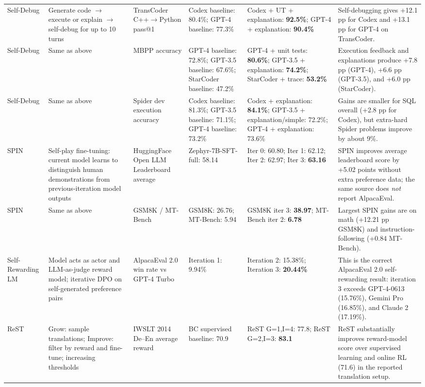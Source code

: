 \begin{table}[t]
{\begin{tabular}{p{2.9cm}p{3.0cm}p{2.7cm}p{2.8cm}p{2.8cm}p{4.8cm}}
Self-Debug \cite{selfdebug2023} & Generate code $\rightarrow$ execute or explain $\rightarrow$ self-debug for up to 10 turns & TransCoder C++$\rightarrow$Python pass@1 & Codex baseline: 80.4\%; GPT-4 baseline: 77.3\% & Codex + UT + explanation: \textbf{92.5\%}; GPT-4 + explanation: \textbf{90.4\%} & Self-debugging gives +12.1 pp for Codex and +13.1 pp for GPT-4 on TransCoder. \\
Self-Debug \cite{selfdebug2023} & Same as above & MBPP accuracy & GPT-4 baseline: 72.8\%; GPT-3.5 baseline: 67.6\%; StarCoder baseline: 47.2\% & GPT-4 + unit tests: \textbf{80.6\%}; GPT-3.5 + explanation: \textbf{74.2\%}; StarCoder + trace: \textbf{53.2\%} & Execution feedback and explanations produce +7.8 pp (GPT-4), +6.6 pp (GPT-3.5), and +6.0 pp (StarCoder). \\
Self-Debug \cite{selfdebug2023} & Same as above & Spider dev execution accuracy & Codex baseline: 81.3\%; GPT-3.5 baseline: 71.1\%; GPT-4 baseline: 73.2\% & Codex + explanation: \textbf{84.1\%}; GPT-3.5 + explanation/simple: 72.2\%; GPT-4 + explanation: 73.6\% & Gains are smaller for SQL overall (+2.8 pp for Codex), but extra-hard Spider problems improve by about 9\%. \\
SPIN \cite{spin2024} & Self-play fine-tuning: current model learns to distinguish human demonstrations from previous-iteration model outputs & HuggingFace Open LLM Leaderboard average & Zephyr-7B-SFT-full: 58.14 & Iter 0: 60.80; Iter 1: 62.12; Iter 2: 62.97; Iter 3: \textbf{63.16} & SPIN improves average leaderboard score by +5.02 points without extra preference data; the same source does \emph{not} report AlpacaEval. \\
SPIN \cite{spin2024} & Same as above & GSM8K / MT-Bench & GSM8K: 26.76; MT-Bench: 5.94 & GSM8K iter 3: \textbf{38.97}; MT-Bench iter 2: \textbf{6.78} & Largest SPIN gains are on math (+12.21 pp GSM8K) and instruction-following (+0.84 MT-Bench). \\
Self-Rewarding LM \cite{selfrewarding2024} & Model acts as actor and LLM-as-judge reward model; iterative DPO on self-generated preference pairs & AlpacaEval 2.0 win rate vs GPT-4 Turbo & Iteration 1: 9.94\% & Iteration 2: 15.38\%; Iteration 3: \textbf{20.44\%} & This is the correct AlpacaEval 2.0 self-rewarding result: iteration 3 exceeds GPT-4-0613 (15.76\%), Gemini Pro (16.85\%), and Claude 2 (17.19\%). \\
ReST \cite{rest2023} & Grow: sample translations; Improve: filter by reward and fine-tune; increasing thresholds & IWSLT 2014 De--En average reward & BC supervised baseline: 70.9 & ReST G=1,I=4: 77.8; ReST G=2,I=3: \textbf{83.1} & ReST substantially improves reward-model score over supervised learning and online RL (71.6) in the reported translation setup. \\

\end{tabular}}
\end{table}
